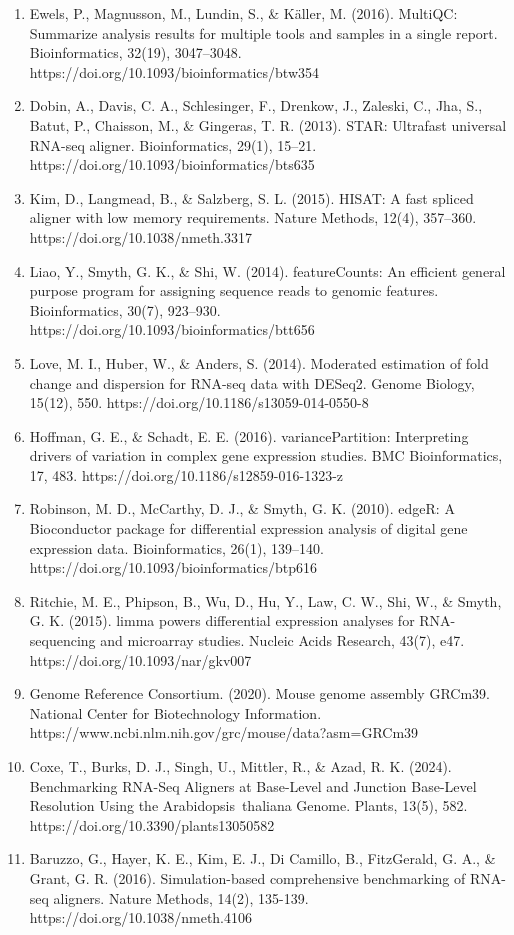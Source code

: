 \documentclass[
  10pt,
]{article}
\begin{document}
\begin{enumerate}
  https://www.bioinformatics.babraham.ac.uk/projects/fastqc/
\item
  Ewels, P., Magnusson, M., Lundin, S., \& Käller, M. (2016). MultiQC:
  Summarize analysis results for multiple tools and samples in a single
  report. Bioinformatics, 32(19), 3047--3048.
  https://doi.org/10.1093/bioinformatics/btw354
\item
  Dobin, A., Davis, C. A., Schlesinger, F., Drenkow, J., Zaleski, C.,
  Jha, S., Batut, P., Chaisson, M., \& Gingeras, T. R. (2013). STAR:
  Ultrafast universal RNA-seq aligner. Bioinformatics, 29(1), 15--21.
  https://doi.org/10.1093/bioinformatics/bts635
\item
  Kim, D., Langmead, B., \& Salzberg, S. L. (2015). HISAT: A fast
  spliced aligner with low memory requirements. Nature Methods, 12(4),
  357--360. https://doi.org/10.1038/nmeth.3317
\item
  Liao, Y., Smyth, G. K., \& Shi, W. (2014). featureCounts: An efficient
  general purpose program for assigning sequence reads to genomic
  features. Bioinformatics, 30(7), 923--930.
  https://doi.org/10.1093/bioinformatics/btt656
\item
  Love, M. I., Huber, W., \& Anders, S. (2014). Moderated estimation of
  fold change and dispersion for RNA-seq data with DESeq2. Genome
  Biology, 15(12), 550. https://doi.org/10.1186/s13059-014-0550-8
\item
  Hoffman, G. E., \& Schadt, E. E. (2016). variancePartition:
  Interpreting drivers of variation in complex gene expression studies.
  BMC Bioinformatics, 17, 483. https://doi.org/10.1186/s12859-016-1323-z
\item
  Robinson, M. D., McCarthy, D. J., \& Smyth, G. K. (2010). edgeR: A
  Bioconductor package for differential expression analysis of digital
  gene expression data. Bioinformatics, 26(1), 139--140.
  https://doi.org/10.1093/bioinformatics/btp616
\item
  Ritchie, M. E., Phipson, B., Wu, D., Hu, Y., Law, C. W., Shi, W., \&
  Smyth, G. K. (2015). limma powers differential expression analyses for
  RNA-sequencing and microarray studies. Nucleic Acids Research, 43(7),
  e47. https://doi.org/10.1093/nar/gkv007
\item
  Genome Reference Consortium. (2020). Mouse genome assembly GRCm39.
  National Center for Biotechnology Information.
  https://www.ncbi.nlm.nih.gov/grc/mouse/data?asm=GRCm39
\item
  Coxe, T., Burks, D. J., Singh, U., Mittler, R., \& Azad, R. K. (2024).
  Benchmarking RNA-Seq Aligners at Base-Level and Junction Base-Level
  Resolution Using the Arabidopsis~thaliana Genome. Plants, 13(5), 582.
  https://doi.org/10.3390/plants13050582
\item
  Baruzzo, G., Hayer, K. E., Kim, E. J., Di Camillo, B., FitzGerald, G.
  A., \& Grant, G. R. (2016). Simulation-based comprehensive
  benchmarking of RNA-seq aligners. Nature Methods, 14(2), 135-139.
  https://doi.org/10.1038/nmeth.4106
\end{enumerate}
\end{document}
